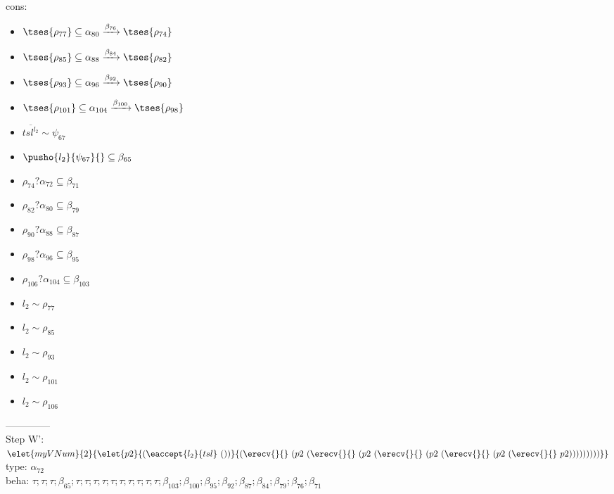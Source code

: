 \documentclass[12pt]{article}
\begin{document}
\\  cons: \begin{itemize}
\item $  \tses{ \rho_{77}} \subseteq \alpha_{80} \xrightarrow{\beta_{76}}  \tses{ \rho_{74}} $
\item $  \tses{ \rho_{85}} \subseteq \alpha_{88} \xrightarrow{\beta_{84}}  \tses{ \rho_{82}} $
\item $  \tses{ \rho_{93}} \subseteq \alpha_{96} \xrightarrow{\beta_{92}}  \tses{ \rho_{90}} $
\item $  \tses{ \rho_{101}} \subseteq \alpha_{104} \xrightarrow{\beta_{100}}  \tses{ \rho_{98}} $
\item $ \overline{{tsl}^{l_{2}}} \sim\psi_{67} $
\item $ \pusho{ l_{2}} {\psi_{67}}{} \subseteq \beta_{65} $
\item $ \rho_{74}?\alpha_{72} \subseteq \beta_{71} $
\item $ \rho_{82}?\alpha_{80} \subseteq \beta_{79} $
\item $ \rho_{90}?\alpha_{88} \subseteq \beta_{87} $
\item $ \rho_{98}?\alpha_{96} \subseteq \beta_{95} $
\item $ \rho_{106}?\alpha_{104} \subseteq \beta_{103} $
\item $ l_{2} \sim\rho_{77} $
\item $ l_{2} \sim\rho_{85} $
\item $ l_{2} \sim\rho_{93} $
\item $ l_{2} \sim\rho_{101} $
\item $ l_{2} \sim\rho_{106} $
\end{itemize} 
  --------------\\ 
Step W': $ \elet{myVNum}{2}{\elet{p2}{(\eaccept{ l_{2} }{tsl}~())}{(\erecv{}{}~(p2~(\erecv{}{}~(p2~(\erecv{}{}~(p2~(\erecv{}{}~(p2~(\erecv{}{}~p2)))))))))}} $\\
  type: $ \alpha_{72} $ 
\\  beha: $ \tau; \tau; \tau; \beta_{65}; \tau; \tau; \tau; \tau; \tau; \tau; \tau; \tau; \tau; \tau; \beta_{103}; \beta_{100}; \beta_{95}; \beta_{92}; \beta_{87}; \beta_{84}; \beta_{79}; \beta_{76}; \beta_{71} $ 
\end{document}

